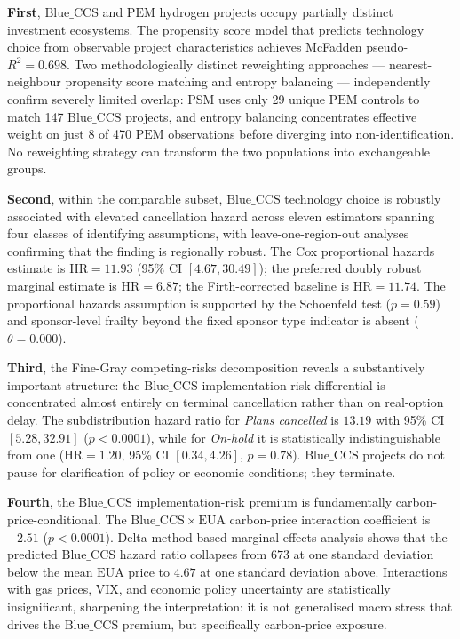\documentclass[11pt,a4paper]{article}
\newcommand{\HR}{\mathrm{HR}}
\newcommand{\BlueCCS}{\mathrm{Blue\_CCS}}
\newcommand{\PEM}{\mathrm{PEM}}
\newcommand{\EUA}{\mathrm{EUA}}
\begin{document}
\textbf{First}, $\BlueCCS$ and $\PEM$ hydrogen projects occupy partially distinct investment ecosystems. The propensity score model that predicts technology choice from observable project characteristics achieves McFadden pseudo-$R^2 = 0.698$. Two methodologically distinct reweighting approaches --- nearest-neighbour propensity score matching and entropy balancing --- independently confirm severely limited overlap: PSM uses only 29 unique $\PEM$ controls to match 147 $\BlueCCS$ projects, and entropy balancing concentrates effective weight on just 8 of 470 $\PEM$ observations before diverging into non-identification. No reweighting strategy can transform the two populations into exchangeable groups.

\textbf{Second}, within the comparable subset, $\BlueCCS$ technology choice is robustly associated with elevated cancellation hazard across eleven estimators spanning four classes of identifying assumptions, with leave-one-region-out analyses confirming that the finding is regionally robust. The Cox proportional hazards estimate is $\HR = 11.93$ (95\% CI $[4.67, 30.49]$); the preferred doubly robust marginal estimate is $\HR = 6.87$; the Firth-corrected baseline is $\HR = 11.74$. The proportional hazards assumption is supported by the Schoenfeld test ($p = 0.59$) and sponsor-level frailty beyond the fixed sponsor type indicator is absent ($\theta = 0.000$).

\textbf{Third}, the Fine-Gray competing-risks decomposition reveals a substantively important structure: the $\BlueCCS$ implementation-risk differential is concentrated almost entirely on terminal cancellation rather than on real-option delay. The subdistribution hazard ratio for \textit{Plans cancelled} is $13.19$ with 95\% CI $[5.28, 32.91]$ ($p < 0.0001$), while for \textit{On-hold} it is statistically indistinguishable from one ($\HR = 1.20$, 95\% CI $[0.34, 4.26]$, $p = 0.78$). $\BlueCCS$ projects do not pause for clarification of policy or economic conditions; they terminate.

\textbf{Fourth}, the $\BlueCCS$ implementation-risk premium is fundamentally carbon-price-conditional. The $\BlueCCS \times \EUA$ carbon-price interaction coefficient is $-2.51$ ($p < 0.0001$). Delta-method-based marginal effects analysis shows that the predicted $\BlueCCS$ hazard ratio collapses from $673$ at one standard deviation below the mean $\EUA$ price to $4.67$ at one standard deviation above. Interactions with gas prices, VIX, and economic policy uncertainty are statistically insignificant, sharpening the interpretation: it is not generalised macro stress that drives the $\BlueCCS$ premium, but specifically carbon-price exposure.
\end{document}
